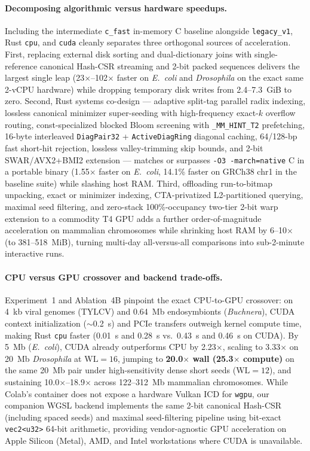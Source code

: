 \documentclass[pdflatex,sn-vancouver,Numbered]{sn-jnl}
\begin{document}
\paragraph{Decomposing algorithmic versus hardware speedups.}
Including the intermediate \texttt{c\_fast} in-memory C baseline alongside \texttt{legacy\_v1}, Rust \texttt{cpu}, and \texttt{cuda} cleanly separates three orthogonal sources of acceleration. First, replacing external disk sorting and dual-dictionary joins with single-reference canonical Hash-CSR streaming and 2-bit packed sequences delivers the largest single leap (23$\times$--102$\times$ faster on \textit{E.~coli} and \textit{Drosophila} on the exact same 2-vCPU hardware) while dropping temporary disk writes from 2.4--7.3~GiB to zero. Second, Rust systems co-design --- adaptive split-tag parallel radix indexing, lossless canonical minimizer super-seeding with high-frequency exact-$k$ overflow routing, const-specialized blocked Bloom screening with \texttt{\_MM\_HINT\_T2} prefetching, 16-byte interleaved \texttt{DiagPair32} + \texttt{ActiveDiagRing} diagonal caching, 64/128-bp fast short-hit rejection, lossless valley-trimming skip bounds, and 2-bit SWAR/AVX2+BMI2 extension --- matches or surpasses \texttt{-O3 -march=native} C in a portable binary (1.55$\times$ faster on \textit{E.~coli}, 14.1\% faster on GRCh38 chr1 in the baseline suite) while slashing host RAM. Third, offloading run-to-bitmap unpacking, exact or minimizer indexing, CTA-privatized L2-partitioned querying, maximal seed filtering, and zero-stack 100\%-occupancy two-tier 2-bit warp extension to a commodity T4 GPU adds a further order-of-magnitude acceleration on mammalian chromosomes while shrinking host RAM by 6--10$\times$ (to 381--518~MiB), turning multi-day all-versus-all comparisons into sub-2-minute interactive runs.

\paragraph{CPU versus GPU crossover and backend trade-offs.}
Experiment~1 and Ablation~4B pinpoint the exact CPU-to-GPU crossover: on 4~kb viral genomes (TYLCV) and 0.64~Mb endosymbionts (\textit{Buchnera}), CUDA context initialization ($\sim$0.2~s) and PCIe transfers outweigh kernel compute time, making Rust \texttt{cpu} faster (0.01~s and 0.28~s vs.\ 0.43~s and 0.46~s on CUDA). By 5~Mb (\textit{E.~coli}), CUDA already outperforms CPU by 2.23$\times$, scaling to 3.33$\times$ on 20~Mb \textit{Drosophila} at $\text{WL}=16$, jumping to \textbf{20.0$\times$ wall (25.3$\times$ compute)} on the same 20~Mb pair under high-sensitivity dense short seeds ($\text{WL}=12$), and sustaining 10.0$\times$--18.9$\times$ across 122--312~Mb mammalian chromosomes. While Colab's container does not expose a hardware Vulkan ICD for \texttt{wgpu}, our companion WGSL backend implements the same 2-bit canonical Hash-CSR (including spaced seeds) and maximal seed-filtering pipeline using bit-exact \texttt{vec2<u32>} 64-bit arithmetic, providing vendor-agnostic GPU acceleration on Apple Silicon (Metal), AMD, and Intel workstations where CUDA is unavailable.
\end{document}
